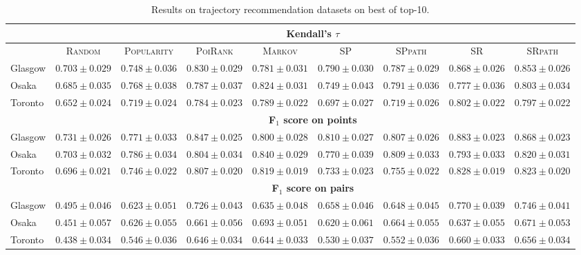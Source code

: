 \begin{table*}[!h]
\caption{Results on trajectory recommendation datasets on best of top-10.}
\centering
\scriptsize
\setlength{\tabcolsep}{3pt} %
\begin{tabular}{l|cc|ccc|ccc} \hline
& \multicolumn{8}{c}{\bf Kendall's $\tau$} \\ \hline
 & \textsc{Random} & \textsc{Popularity} & \textsc{PoiRank} & \textsc{Markov} & \textsc{SP} & \textsc{SPpath} & \textsc{SR} & \textsc{SRpath} \\ \hline
Glasgow & $0.703\pm0.029$ & $0.748\pm0.036$ & $0.830\pm0.029$ & $0.781\pm0.031$ & $0.790\pm0.030$ & $0.787\pm0.029$ & $\mathbf{0.868\pm0.026}$ & $\mathit{0.853\pm0.026}$ \\
Osaka & $0.685\pm0.035$ & $0.768\pm0.038$ & $0.787\pm0.037$ & $\mathbf{0.824\pm0.031}$ & $0.749\pm0.043$ & $0.791\pm0.036$ & $0.777\pm0.036$ & $\mathit{0.803\pm0.034}$ \\
Toronto & $0.652\pm0.024$ & $0.719\pm0.024$ & $0.784\pm0.023$ & $0.789\pm0.022$ & $0.697\pm0.027$ & $0.719\pm0.026$ & $\mathbf{0.802\pm0.022}$ & $\mathit{0.797\pm0.022}$ \\
\hline
& \multicolumn{8}{c}{\bf F$_1$ score on points} \\ \hline
Glasgow & $0.731\pm0.026$ & $0.771\pm0.033$ & $0.847\pm0.025$ & $0.800\pm0.028$ & $0.810\pm0.027$ & $0.807\pm0.026$ & $\mathbf{0.883\pm0.023}$ & $\mathit{0.868\pm0.023}$ \\
Osaka & $0.703\pm0.032$ & $0.786\pm0.034$ & $0.804\pm0.034$ & $\mathbf{0.840\pm0.029}$ & $0.770\pm0.039$ & $0.809\pm0.033$ & $0.793\pm0.033$ & $\mathit{0.820\pm0.031}$ \\
Toronto & $0.696\pm0.021$ & $0.746\pm0.022$ & $0.807\pm0.020$ & $0.819\pm0.019$ & $0.733\pm0.023$ & $0.755\pm0.022$ & $\mathbf{0.828\pm0.019}$ & $\mathit{0.823\pm0.020}$ \\
\hline
& \multicolumn{8}{c}{\bf F$_1$ score on pairs} \\ \hline
Glasgow & $0.495\pm0.046$ & $0.623\pm0.051$ & $0.726\pm0.043$ & $0.635\pm0.048$ & $0.658\pm0.046$ & $0.648\pm0.045$ & $\mathbf{0.770\pm0.039}$ & $\mathit{0.746\pm0.041}$ \\
Osaka & $0.451\pm0.057$ & $0.626\pm0.055$ & $0.661\pm0.056$ & $\mathbf{0.693\pm0.051}$ & $0.620\pm0.061$ & $0.664\pm0.055$ & $0.637\pm0.055$ & $\mathit{0.671\pm0.053}$ \\
Toronto & $0.438\pm0.034$ & $0.546\pm0.036$ & $0.646\pm0.034$ & $0.644\pm0.033$ & $0.530\pm0.037$ & $0.552\pm0.036$ & $\mathbf{0.660\pm0.033}$ & $\mathit{0.656\pm0.034}$ \\
\hline
\end{tabular}
\end{table*}
